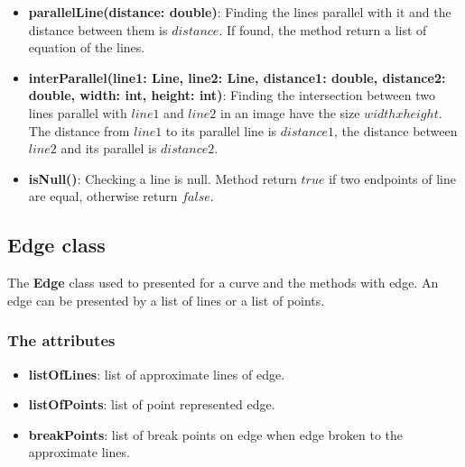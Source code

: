 \begin{itemize}
\item\textbf{parallelLine(distance: double)}: Finding the lines parallel with it and the distance between them is $distance$. If found, the method return a list of equation of the lines.
\item\textbf{interParallel(line1: Line, line2: Line, distance1: double, distance2: double, width: int, height: int)}: Finding the intersection between two lines parallel with $line1$ and $line2$ in an image have the size $width x height$. The distance from $line1$ to its parallel line is $distance1$, the distance between $line2$ and its parallel is $distance2$.
\item\textbf{isNull()}: Checking a line is null. Method return $true$ if two endpoints of line are equal, otherwise return $false$.
\end{itemize}
\subsection{Edge class}
The \textbf{Edge} class used to presented for a curve and the methods with edge. An edge can be presented by a list of lines or a list of points.
\subsubsection{The attributes}
\begin{itemize}
\item\textbf{listOfLines}: list of approximate lines of edge.
\item\textbf{listOfPoints}: list of point represented edge.
\item\textbf{breakPoints}: list of break points on edge when edge broken to the approximate lines.
\end{itemize}
